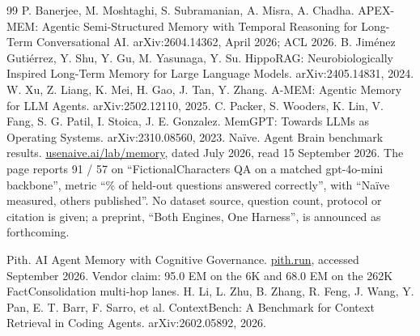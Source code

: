 \documentclass[11pt]{article}
\begin{document}
\begin{thebibliography}{99}
 P. Banerjee, M. Moshtaghi, S. Subramanian, A. Misra, A. Chadha. APEX-MEM:
  Agentic Semi-Structured Memory with Temporal Reasoning for Long-Term Conversational AI.
  arXiv:2604.14362, April 2026; ACL 2026.
 B. Jim\'enez Guti\'errez, Y. Shu, Y. Gu, M. Yasunaga, Y. Su. HippoRAG:
  Neurobiologically Inspired Long-Term Memory for Large Language Models. arXiv:2405.14831, 2024.
 W. Xu, Z. Liang, K. Mei, H. Gao, J. Tan, Y. Zhang. A-MEM: Agentic Memory
  for LLM Agents. arXiv:2502.12110, 2025.
 C. Packer, S. Wooders, K. Lin, V. Fang, S. G. Patil, I. Stoica,
  J. E. Gonzalez. MemGPT: Towards LLMs as Operating Systems. arXiv:2310.08560, 2023.
 Na\"ive. Agent Brain benchmark results.
\url{usenaive.ai/lab/memory}, dated July 2026, read 15 September 2026. The page
reports 91 / 57 on ``FictionalCharacters QA on a matched gpt-4o-mini backbone'',
metric ``\% of held-out questions answered correctly'', with ``Na\"ive measured,
others published''. No dataset source, question count, protocol or citation is
given; a preprint, ``Both Engines, One Harness'', is announced as forthcoming.

 Pith. AI Agent Memory with Cognitive Governance. \url{pith.run}, accessed
  September 2026. Vendor claim: 95.0 EM on the 6K and 68.0 EM on the 262K
  FactConsolidation multi-hop lanes.
 H. Li, L. Zhu, B. Zhang, R. Feng, J. Wang, Y. Pan, E. T. Barr,
  F. Sarro, et al. ContextBench: A Benchmark for Context Retrieval in Coding Agents.
  arXiv:2602.05892, 2026.
\end{thebibliography}
\end{document}
